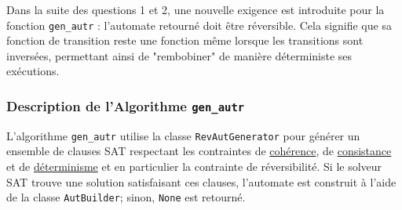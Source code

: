 Dans la suite des questions 1 et 2, une nouvelle exigence est introduite pour la fonction \texttt{gen\_autr} : l'automate retourné doit être réversible. Cela signifie que sa fonction de transition reste une fonction même lorsque les transitions sont inversées, permettant ainsi de "rembobiner" de manière déterministe ses exécutions. 

\subsubsection*{Description de l'Algorithme \texttt{gen\_autr}}

L'algorithme \texttt{gen\_autr} utilise la classe \texttt{RevAutGenerator} pour générer un ensemble de clauses SAT respectant les contraintes de \hyperref[cohérence]{cohérence}, de \hyperref[consistance]{consistance} et de \hyperref[determinisme]{déterminisme} et en particulier la contrainte de réversibilité. Si le solveur SAT trouve une solution satisfaisant ces clauses, l'automate est construit à l'aide de la classe \texttt{AutBuilder}; sinon, \texttt{None} est retourné.

\vspace{0.5cm}

